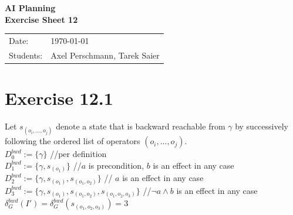 \documentclass[11pt,a4paper]{article}
\newcommand{\sheetNr}{12}
\begin{document}
\begin{center}
\Huge{\textbf{AI Planning}}\\
\LARGE{\textbf{Exercise Sheet \sheetNr}}
\end{center}
\vspace{2cm}
\begin{tabular}{ll}
Date: & \today\\
Students: & Axel Perschmann, Tarek Saier
\end{tabular}

\section*{Exercise 12.1}
Let $s_{(o_i,...,o_j)}$ denote a state that is backward reachable from $\gamma$ by successively following the ordered list of operators $(o_i,...,o_j)$.\\
$D^{bwd}_0:=\{\gamma\}$ \hphantom{tabtab} //per definition\\
$D^{bwd}_1:=\{\gamma,s_{(o_1)}\}$ \hphantom{tabtab} //$a$ is precondition, $b$ is an effect in any case\\
$D^{bwd}_2:=\{\gamma,s_{(o_1)},s_{(o_1,o_2)}\}$ \hphantom{tabtab} // $a$ is an effect in any case\\
$D^{bwd}_3:=\{\gamma,s_{(o_1)},s_{(o_1,o_2)},s_{(o_1,o_2,o_3)}\}$ \hphantom{tabtab} //$\neg a\land b$ is an effect in any case\\
$\delta^{bwd}_G(I')=\delta^{bwd}_G(s_{(o_1,o_2,o_3)})=3$
\end{document}
